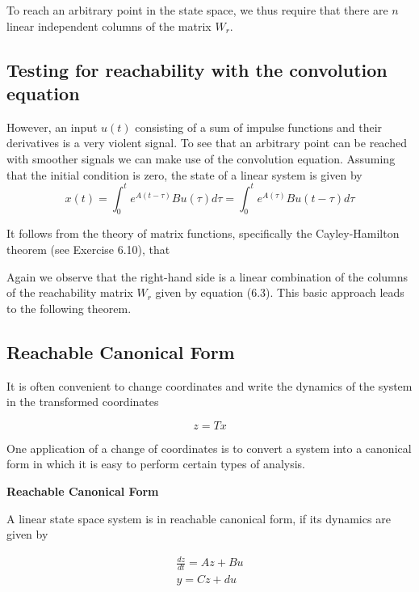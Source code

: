 To reach an arbitrary point  in the state  space,  we  thus  require 
  that there are $n$ linear independent columns of the matrix $W_r$. 




\subsection{Testing for reachability with the convolution equation}

However, an input $u(t)$ consisting of a sum of impulse functions and their derivatives is a very
violent signal. To see that an arbitrary point can be reached with smoother signals we can make use of the convolution equation. Assuming that the initial condition is zero, the state of a linear system is given by
\begin{equation}
x(t)  = \int_{0}^{t} e^{A(t-\tau)}Bu(\tau)d\tau = \int_{0}^{t} e^{A(\tau)}Bu(t-\tau)d\tau
\end{equation}

It follows from the theory of matrix functions, specifically the Cayley-Hamilton
theorem (see Exercise 6.10), that








Again we observe that the right-hand side is a linear combination of the columns
of the reachability matrix $W_r$ given by equation (6.3). This basic approach leads to
the following theorem.




\subsection{Reachable Canonical Form}

It is often convenient to change coordinates and write the dynamics of the system in the transformed coordinates

\begin{equation}
z = Tx
\end{equation}

One application of a change of coordinates is to convert a system into a
canonical form in which it is easy to perform certain types of analysis.


\begin{framed}
\theoremstyle{remark}
\begin{remark}{\textbf{Reachable Canonical Form}}

A linear state space system is in reachable canonical form, if its dynamics are given by

\begin{eqnarray}
\frac{dz}{dt} = Az + Bu \\
y=Cz + du
\end{eqnarray}

\end{remark}
\end{framed}

